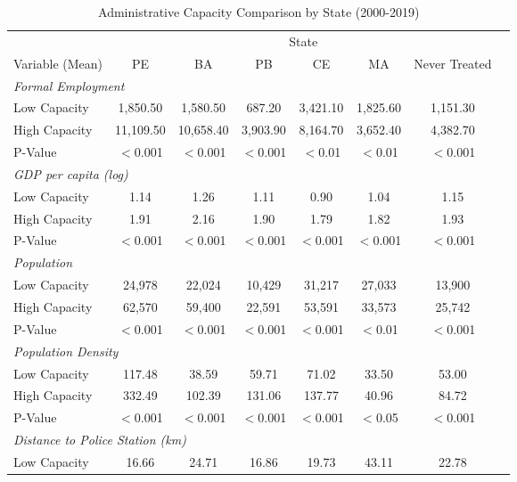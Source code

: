 \documentclass[12pt]{article}
\begin{document}
\begin{table}[htbp]
\centering
\caption{Administrative Capacity Comparison by State (2000-2019)}
\label{tab:capacity_comparison}
\begin{threeparttable}
\small
\begin{adjustbox}{max width=\textwidth}
\begin{tabular}{lccccccc}
\toprule
& \multicolumn{6}{c}{State} & \\
\cmidrule(lr){2-7}
Variable (Mean) & PE & BA & PB & CE & MA & Never Treated \\
\midrule
\multicolumn{8}{l}{\textit{Formal Employment}} \\
\quad Low Capacity & 1,850.50 & 1,580.50 & 687.20 & 3,421.10 & 1,825.60 & 1,151.30 & \\
\quad High Capacity & 11,109.50 & 10,658.40 & 3,903.90 & 8,164.70 & 3,652.40 & 4,382.70 \\
\quad P-Value & $<$0.001 & $<$0.001 & $<$0.001 & $<$0.01 & $<$0.01 & $<$0.001 \\[4pt]
\multicolumn{8}{l}{\textit{GDP per capita (log)}} \\
\quad Low Capacity & 1.14 & 1.26 & 1.11 & 0.90 & 1.04 & 1.15 & \\
\quad High Capacity & 1.91 & 2.16 & 1.90 & 1.79 & 1.82 & 1.93 \\
\quad P-Value & $<$0.001 & $<$0.001 & $<$0.001 & $<$0.001 & $<$0.001 & $<$0.001 \\[4pt]
\multicolumn{8}{l}{\textit{Population}} \\
\quad Low Capacity & 24,978 & 22,024 & 10,429 & 31,217 & 27,033 & 13,900 & \\
\quad High Capacity & 62,570 & 59,400 & 22,591 & 53,591 & 33,573 & 25,742 \\
\quad P-Value & $<$0.001 & $<$0.001 & $<$0.001 & $<$0.001 & $<$0.01 & $<$0.001 \\[4pt]
\multicolumn{8}{l}{\textit{Population Density}} \\
\quad Low Capacity & 117.48 & 38.59 & 59.71 & 71.02 & 33.50 & 53.00 & \\
\quad High Capacity & 332.49 & 102.39 & 131.06 & 137.77 & 40.96 & 84.72 \\
\quad P-Value & $<$0.001 & $<$0.001 & $<$0.001 & $<$0.001 & $<$0.05 & $<$0.001 \\[4pt]
\multicolumn{8}{l}{\textit{Distance to Police Station (km)}} \\
\quad Low Capacity & 16.66 & 24.71 & 16.86 & 19.73 & 43.11 & 22.78 & \\

\end{tabular}
\end{adjustbox}
\end{threeparttable}
\end{table}
\end{document}
